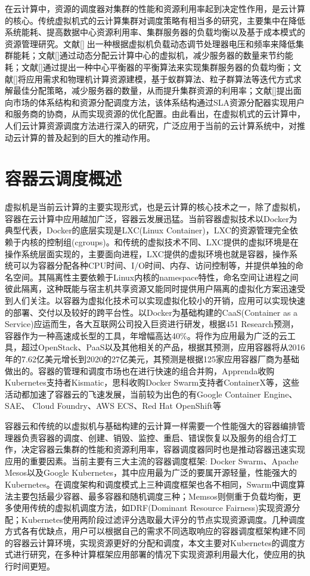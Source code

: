 在云计算中，资源的调度器对集群的性能和资源利用率起到决定性作用，是云计算的核心。传统虚拟机式的云计算集群对调度策略有相当多的研究，主要集中在降低系统能耗、提高数据中心资源利用率、集群服务器的负载均衡以及基于成本模式的资源管理研究。文献[]􏰁出一种根据虚拟机负载动态调节处理器电压和频率来降低集群能耗；文献[]通过动态分配云计算中心的虚拟机，减少服务器的数量来节约能耗；文献[]通过提出一种中心平衡器的平衡算法来实现集群服务器的负载均衡；文献[]将应用需求和物理机计算资源建模，基于蚁群算法、粒子群算法等迭代方式求解最佳分配策略，减少服务器的数量，从而提升集群资源的利用率；文献[]提出面向市场的体系结构和资源分配调度方法，该体系结构通过SLA资源分配器实现用户和服务商的协商，从而实现资源的优化配置。由此看出，在虚拟机式的云计算中，人们云计算资源调度方法进行深入的研究，广泛应用于当前的云计算系统中，对推动云计算的普及起到的巨大的推动作用。

\section{容器云调度概述}
虚拟机是当前云计算的主要实现形式，也是云计算的核心技术之一，除了虚拟机，容器在云计算中应用越加广泛，容器云发展迅猛。当前容器虚拟技术以Docker为典型代表，Docker的底层实现是LXC(Linux Container)，LXC的资源管理完全依赖于内核的控制组(cgroups)。和传统的虚拟技术不同、LXC提供的虚拟环境是在操作系统层面实现的，主要面向进程，LXC提供的虚拟环境也就是容器，操作系统可以为容器分配各种CPU时间、I/O时间、内存、访问控制等，并提供单独的命名空间。其隔离性主要依赖于Linux内核的namespace特性，命名空间让进程之间彼此隔离，这种既能与宿主机共享资源又能同时提供用户隔离的虚拟化方案迅速受到人们关注。以容器为虚拟化技术可以实现虚拟化较小的开销，应用可以实现快速的部署、交付以及较好的跨平台性。以Docker为基础构建的CaaS(Container as a Service)应运而生，各大互联网公司投入巨资进行研发，根据451 Research预测，容器作为一种高速成长型的工具，年增幅高达40\%。将作为应用最为广泛的云工具，超过OpenStack、PaaS以及其他相关的产品，根据其预测，应用容器将从2016年的7.62亿美元增长到2020的27亿美元，其预测是根据125家应用容器厂商为基础做出的。容器的管理和调度市场也在进行快速的组合并购，Apprenda收购Kubernetes支持者Kismatic，思科收购Docker Swarm支持者ContainerX等，这些活动都加速了容器云的飞速发展，当前较为出色的有Google Container Engine、SAE、 Cloud Foundry、AWS ECS、Red Hat OpenShift等

容器云和传统的以虚拟机与基础构建的云计算一样需要一个性能强大的容器编排管理器负责容器的调度、创建、销毁、监控、重启、错误恢复以及服务的组合灯工作，决定容器云集群的性能和资源利用率，容器调度器同时也是推动容器迅速实现应用的重要因素。当前主要有三大主流的容器调度框架: Docker Swarm、Apache Mesos以及Google Kubernetes，其中应用最为广泛的要属开源轻量，性能强大的Kubernetes。在调度架构和调度模式上三种调度框架也各不相同，Swarm中调度算法主要包括最少容器、最多容器和随机调度三种；Memsos则侧重于负载均衡，更多使用传统的虚拟机调度方法，如DRF(Dominant Resource Fairness)实现资源分配；Kubernetes使用两阶段过滤评分选取最大评分的节点实现资源调度。几种调度方式各有优缺点，用户可以根据自己的需求不同选取响应的容器调度框架构建不同的容器云计算环境，实现资源更好的分配和调度，本文主要对Kubernetes的调度方式进行研究，在多种计算框架应用部署的情况下实现资源利用最大化，使应用的执行时间更短。

